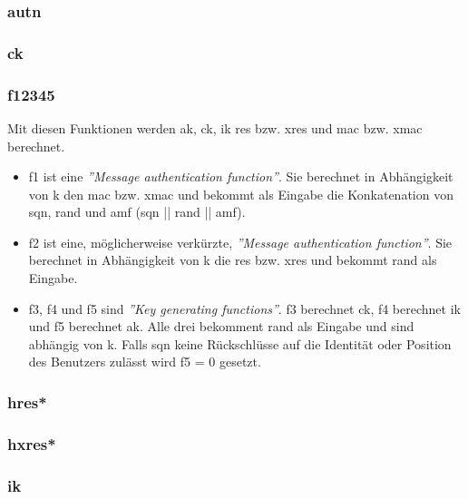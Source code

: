 \subsubsection{\gls{autn}}

\subsubsection{\gls{ck}}

\subsubsection{\gls{f12345}}
Mit diesen Funktionen werden \gls{ak}, \gls{ck}, \gls{ik} \gls{res} bzw. \gls{xres} und \gls{mac} bzw. \gls{xmac} berechnet. %
\begin{itemize}
\item f1 ist eine \textit{''Message authentication function''}.
Sie berechnet in Abh\"angigkeit von \gls{k} den \gls{mac} bzw. \gls{xmac} und bekommt als Eingabe die Konkatenation von \gls{sqn}, \gls{rand} und \gls{amf} (\gls{sqn} || \gls{rand} || \gls{amf}). \\
\item f2 ist eine, m\"oglicherweise verk\"urzte, \textit{''Message authentication function''}.
Sie berechnet in Abh\"angigkeit von \gls{k} die \gls{res} bzw. \gls{xres} und bekommt \gls{rand} als Eingabe.
\item f3, f4 und f5 sind \textit{''Key generating functions''}.
f3 berechnet \gls{ck}, f4 berechnet \gls{ik} und f5 berechnet \gls{ak}.
Alle drei bekomment \gls{rand} als Eingabe und sind abh\"angig von \gls{k}.
Falls \gls{sqn} keine R\"uckschl\"usse auf die Identit\"at oder Position des Benutzers zul\"asst wird f5 = 0 gesetzt.
\end{itemize}

\subsubsection{\gls{hres*}}

\subsubsection{\gls{hxres*}}

\subsubsection{\gls{ik}}

